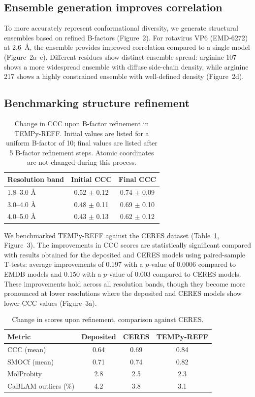 \documentclass[11pt]{article}
\begin{document}
\subsection{Ensemble generation improves correlation}

To more accurately represent conformational diversity, we generate structural ensembles based on refined B-factors (Figure~2). For rotavirus VP6 (EMD-6272) at 2.6~\AA, the ensemble provides improved correlation compared to a single model (Figure~2a--c). Different residues show distinct ensemble spread: arginine 107 shows a more widespread ensemble with diffuse side-chain density, while arginine 217 shows a highly constrained ensemble with well-defined density (Figure~2d).

\subsection{Benchmarking structure refinement}

\begin{table}[htbp]
\centering
\caption{Change in CCC upon B-factor refinement in TEMPy-REFF. Initial values are listed for a uniform B-factor of 10; final values are listed after 5 B-factor refinement steps. Atomic coordinates are not changed during this process.}
\label{tab:bfactor}
\begin{tabular}{lcc}
\toprule
Resolution band & Initial CCC & Final CCC \\
\midrule
1.8--3.0 \AA & 0.52 $\pm$ 0.12 & 0.74 $\pm$ 0.09 \\
3.0--4.0 \AA & 0.48 $\pm$ 0.11 & 0.69 $\pm$ 0.10 \\
4.0--5.0 \AA & 0.43 $\pm$ 0.13 & 0.62 $\pm$ 0.12 \\
\bottomrule
\end{tabular}
\end{table}

We benchmarked TEMPy-REFF against the CERES dataset \citep{ceres2021} (Table~\ref{tab:bfactor}, Figure~3). The improvements in CCC scores are statistically significant compared with results obtained for the deposited and CERES models using paired-sample T-tests: average improvements of 0.197 with a $p$-value of 0.0006 compared to EMDB models and 0.150 with a $p$-value of 0.003 compared to CERES models. These improvements hold across all resolution bands, though they become more pronounced at lower resolutions where the deposited and CERES models show lower CCC values (Figure~3a).

\begin{table}[htbp]
\centering
\caption{Change in scores upon refinement, comparison against CERES.}
\label{tab:scores}
\begin{tabular}{lccc}
\toprule
Metric & Deposited & CERES & TEMPy-REFF \\
\midrule
CCC (mean) & 0.64 & 0.69 & 0.84 \\
SMOCf (mean) & 0.71 & 0.74 & 0.82 \\
MolProbity & 2.8 & 2.5 & 2.3 \\
CaBLAM outliers (\%) & 4.2 & 3.8 & 3.1 \\
\bottomrule
\end{tabular}
\end{table}
\end{document}
